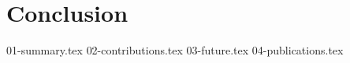 \chapter{Conclusion}
\label{conclusion:chapter}


{01-summary.tex}
{02-contributions.tex}
{03-future.tex}
{04-publications.tex}

